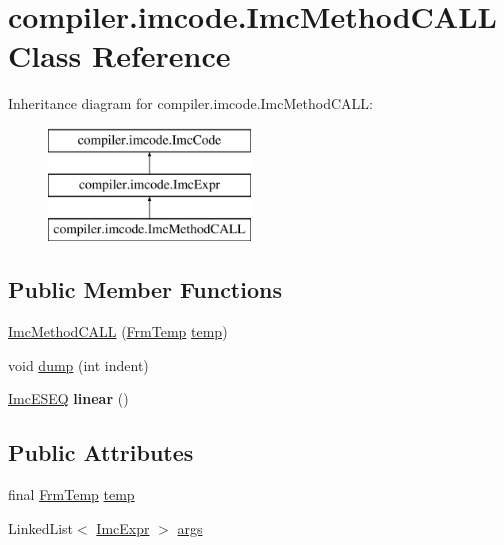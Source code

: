 \hypertarget{classcompiler_1_1imcode_1_1_imc_method_c_a_l_l}{}\section{compiler.\+imcode.\+Imc\+Method\+C\+A\+LL Class Reference}
\label{classcompiler_1_1imcode_1_1_imc_method_c_a_l_l}
Inheritance diagram for compiler.\+imcode.\+Imc\+Method\+C\+A\+LL\+:\begin{figure}[H]
\begin{center}
\leavevmode
\includegraphics[height=3.000000cm]{classcompiler_1_1imcode_1_1_imc_method_c_a_l_l}
\end{center}
\end{figure}
\subsection*{Public Member Functions}
\begin{DoxyCompactItemize}
\item 
\hyperlink{classcompiler_1_1imcode_1_1_imc_method_c_a_l_l_af7be07b40dec082e2ea56f8a494491af}{Imc\+Method\+C\+A\+LL} (\hyperlink{classcompiler_1_1frames_1_1_frm_temp}{Frm\+Temp} \hyperlink{classcompiler_1_1imcode_1_1_imc_method_c_a_l_l_ae731218c72c3f46608a9c35644e40fe3}{temp})
\item 
void \hyperlink{classcompiler_1_1imcode_1_1_imc_method_c_a_l_l_a43e53dfa27eb848d9168b20e9e0bd972}{dump} (int indent)
\item 
\mbox{\label{classcompiler_1_1imcode_1_1_imc_method_c_a_l_l_a39c588581ccc7a1a36b8380251c418cf}} 
\hyperlink{classcompiler_1_1imcode_1_1_imc_e_s_e_q}{Imc\+E\+S\+EQ} {\bfseries linear} ()
\end{DoxyCompactItemize}
\subsection*{Public Attributes}
\begin{DoxyCompactItemize}
\item 
final \hyperlink{classcompiler_1_1frames_1_1_frm_temp}{Frm\+Temp} \hyperlink{classcompiler_1_1imcode_1_1_imc_method_c_a_l_l_ae731218c72c3f46608a9c35644e40fe3}{temp}
\item 
Linked\+List$<$ \hyperlink{classcompiler_1_1imcode_1_1_imc_expr}{Imc\+Expr} $>$ \hyperlink{classcompiler_1_1imcode_1_1_imc_method_c_a_l_l_a21670c3df2268c7c55bea5075f0b614a}{args}
\end{DoxyCompactItemize}



